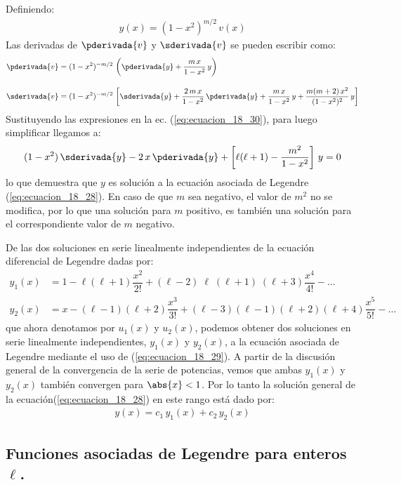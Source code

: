 \par
Definiendo:
\begin{align*}
y (x) = (1 - x^{2}) ^{m/2} \, v(x)
\end{align*}
Las derivadas de $\pderivada{v}$ y $\sderivada{v}$ se pueden escribir como:
\begin{align*}
\pderivada{v} &= (1 - x^{2})^{-m/2} \, \left( \pderivada{y} + \dfrac{m \, x}{1 -x^{2}} \, y \right) \\[1em]
\sderivada{v} &= (1 - x^{2})^{-m/2} \, \left[ \sderivada{y} + \dfrac{2 \, m \, x}{1 -x^{2}} \, \pderivada{y} + \dfrac{m \, x}{1 -x^{2}} \, y + \dfrac{m(m + 2) \, x^{2}}{(1 -x^{2})^{2}} \, y \right]
\end{align*}
Sustituyendo las expresiones en la ec. (\ref{eq:ecuacion_18_30}), para luego simplificar llegamos a:
\begin{align*}
(1 - x^{2}) \, \sderivada{y} - 2 \, x \, \pderivada{y} + \left[ \ell (\ell + 1) - \dfrac{m^{2}}{1 - x^{2}} \right] \, y = 0
\end{align*}
lo que demuestra que $y$ es solución a la ecuación asociada de Legendre (\ref{eq:ecuacion_18_28}). En caso de que $m$ sea negativo, el valor de $m^{2}$ no se modifica, por lo que una solución para $m$ positivo, es también una solución para el correspondiente valor de $m$ negativo.
\par
De las dos soluciones en serie linealmente independientes de la ecuación diferencial de Legendre dadas por:
\begin{align*}
y_{1} (x) &= 1 - \ell (\ell + 1) \dfrac{x^{2}}{2!} + (\ell - 2)\; \ell \; (\ell + 1)\;(\ell + 3) \dfrac{x^{4}}{4!} - \ldots \\[1em]
y_{2} (x) &= x - (\ell - 1)(\ell + 2) \dfrac{x^{3}}{3!} + (\ell - 3) (\ell - 1)(\ell + 2)(\ell + 4) \dfrac{x^{5}}{5!} - \ldots
\end{align*}
que ahora denotamos por $u_{1} (x)$ y $u_{2} (x)$, podemos obtener dos soluciones en serie linealmente independientes, $y_{1} (x)$ y $y_{2} (x)$, a la ecuación asociada de Legendre mediante el uso de (\ref{eq:ecuacion_18_29}). A partir de la discusión general de la convergencia de la serie de potencias, vemos que ambas $y_{1} (x)$ y $y_{2} (x)$ también convergen para $\abs{x} < 1$. Por lo tanto la solución general de la ecuación(\ref{eq:ecuacion_18_28}) en este rango está dado por:
\begin{align*}
y (x) = c_{1} \, y_{1} (x) + c_{2} \, y_{2} (x)
\end{align*}

\subsection{Funciones asociadas de Legendre para enteros \texorpdfstring{$\ell$}{l}.}

